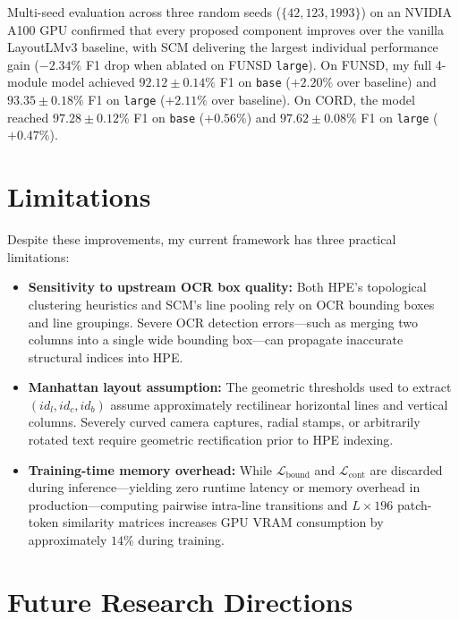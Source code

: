 Multi-seed evaluation across three random seeds ($\{42, 123, 1993\}$) on an NVIDIA A100 GPU confirmed that every proposed component improves over the vanilla LayoutLMv3 baseline, with SCM delivering the largest individual performance gain ($-2.34\%$ F1 drop when ablated on FUNSD \texttt{large}). On FUNSD, my full 4-module model achieved $92.12 \pm 0.14\%$ F1 on \texttt{base} ($+2.20\%$ over baseline) and $93.35 \pm 0.18\%$ F1 on \texttt{large} ($+2.11\%$ over baseline). On CORD, the model reached $97.28 \pm 0.12\%$ F1 on \texttt{base} ($+0.56\%$) and $97.62 \pm 0.08\%$ F1 on \texttt{large} ($+0.47\%$).

\section{Limitations}
\label{sec:conclusion_limitations}

Despite these improvements, my current framework has three practical limitations:
\begin{itemize}
    \item \textbf{Sensitivity to upstream OCR box quality:} Both HPE's topological clustering heuristics and SCM's line pooling rely on OCR bounding boxes and line groupings. Severe OCR detection errors—such as merging two columns into a single wide bounding box—can propagate inaccurate structural indices into HPE.
    \item \textbf{Manhattan layout assumption:} The geometric thresholds used to extract $(id_l, id_c, id_b)$ assume approximately rectilinear horizontal lines and vertical columns. Severely curved camera captures, radial stamps, or arbitrarily rotated text require geometric rectification prior to HPE indexing.
    \item \textbf{Training-time memory overhead:} While $\mathcal{L}_{\text{bound}}$ and $\mathcal{L}_{\text{cont}}$ are discarded during inference—yielding zero runtime latency or memory overhead in production—computing pairwise intra-line transitions and $L \times 196$ patch-token similarity matrices increases GPU VRAM consumption by approximately $14\%$ during training.
\end{itemize}

\section{Future Research Directions}
\label{sec:conclusion_future_work}

